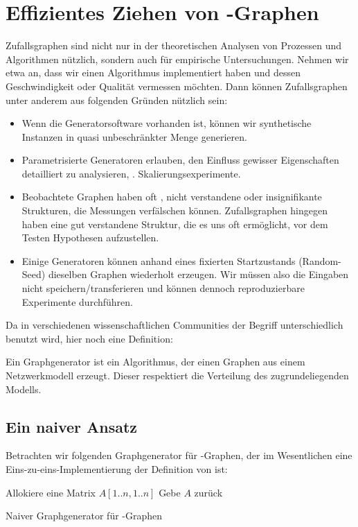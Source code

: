 \section{Effizientes Ziehen von \Gnp-Graphen}
Zufallsgraphen sind nicht nur in der theoretischen Analysen von Prozessen und Algorithmen nützlich, sondern auch für empirische Untersuchungen.
Nehmen wir etwa an, dass wir einen Algorithmus implementiert haben und dessen Geschwindigkeit oder Qualität vermessen möchten.
Dann können Zufallsgraphen unter anderem aus folgenden Gründen nützlich sein:
\begin{itemize}
    \item Wenn die Generatorsoftware vorhanden ist, können wir synthetische Instanzen in quasi unbeschränkter Menge generieren.
    \item Parametrisierte Generatoren erlauben, den Einfluss gewisser Eigenschaften detailliert zu analysieren, \zB. Skalierungsexperimente.
    \item Beobachtete Graphen haben oft , \dh nicht verstandene oder insignifikante Strukturen, die Messungen verfälschen können.
          Zufallsgraphen hingegen haben \idR eine gut verstandene Struktur, die es uns oft ermöglicht, vor dem Testen Hypothesen aufzustellen.
    \item Einige Generatoren können anhand eines fixierten Startzustands (Random-Seed) dieselben Graphen wiederholt erzeugen.
          Wir müssen also die Eingaben nicht speichern/transferieren und können dennoch reproduzierbare Experimente durchführen.
\end{itemize}

\noindent Da in verschiedenen wissenschaftlichen Communities der Begriff  unterschiedlich benutzt wird, hier noch eine Definition:
\begin{definition}
    Ein  Graphgenerator ist ein Algorithmus, der einen Graphen aus einem Netzwerkmodell erzeugt.
    Dieser respektiert die Verteilung des zugrundeliegenden Modells.
\end{definition}

\subsection{Ein naiver Ansatz}
Betrachten wir folgenden Graphgenerator für \Gnp-Graphen, der im Wesentlichen eine Eins-zu-eins-Implementierung der Definition von \Gnp ist:

\begin{algorithm}[H]
    Allokiere eine Matrix $A[1..n, 1..n]$\;
    Gebe $A$ zurück
    \caption{Naiver Graphgenerator für \Gnp-Graphen}
    \label{alg:naive-gnp}
\end{algorithm}

